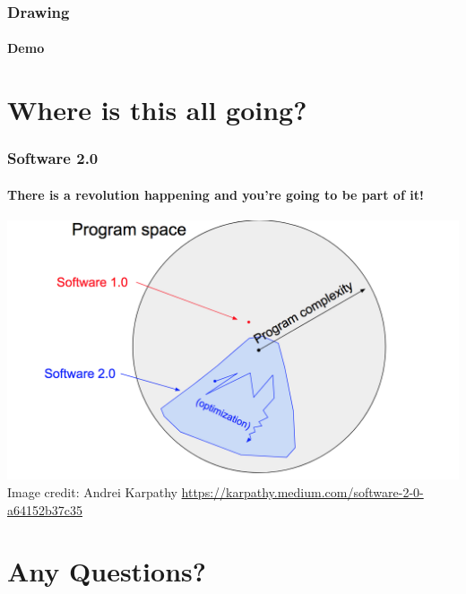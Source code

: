 \documentclass[\beamerclass]{beamer}
\begin{document}
\begin{frame}
\frametitle{Drawing}
\framesubtitle{Demo}

\end{frame}

\section{Where is this all going?}

\begin{frame}
\frametitle{Software 2.0}
\framesubtitle{There is a revolution happening and you're going to be part of it!}

\centering
\includegraphics[scale=0.24]{software2_0}\\
Image credit: Andrei Karpathy \url{https://karpathy.medium.com/software-2-0-a64152b37c35}
\end{frame}

\section{Any Questions?}
\end{document}
